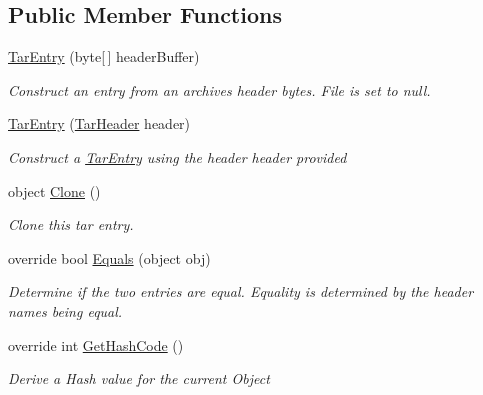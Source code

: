 \subsection*{Public Member Functions}
\begin{DoxyCompactItemize}
\item 
\hyperlink{class_i_c_sharp_code_1_1_sharp_zip_lib_1_1_tar_1_1_tar_entry_aa78f82fed0377b9b19d6d19eee461203}{Tar\+Entry} (byte\mbox{[}$\,$\mbox{]} header\+Buffer)
\begin{DoxyCompactList}\small\item\em Construct an entry from an archive\textquotesingle{}s header bytes. File is set to null. \end{DoxyCompactList}\item 
\hyperlink{class_i_c_sharp_code_1_1_sharp_zip_lib_1_1_tar_1_1_tar_entry_a3414a4fec2eb0cabf50995e25638d2f1}{Tar\+Entry} (\hyperlink{class_i_c_sharp_code_1_1_sharp_zip_lib_1_1_tar_1_1_tar_header}{Tar\+Header} header)
\begin{DoxyCompactList}\small\item\em Construct a \hyperlink{class_i_c_sharp_code_1_1_sharp_zip_lib_1_1_tar_1_1_tar_entry}{Tar\+Entry} using the {\itshape header} header provided \end{DoxyCompactList}\item 
object \hyperlink{class_i_c_sharp_code_1_1_sharp_zip_lib_1_1_tar_1_1_tar_entry_a57cc33b32d0a8bd13b53610f77465bf0}{Clone} ()
\begin{DoxyCompactList}\small\item\em Clone this tar entry. \end{DoxyCompactList}\item 
override bool \hyperlink{class_i_c_sharp_code_1_1_sharp_zip_lib_1_1_tar_1_1_tar_entry_a92ca060b2f9636dc6d1c78048848268e}{Equals} (object obj)
\begin{DoxyCompactList}\small\item\em Determine if the two entries are equal. Equality is determined by the header names being equal. \end{DoxyCompactList}\item 
override int \hyperlink{class_i_c_sharp_code_1_1_sharp_zip_lib_1_1_tar_1_1_tar_entry_a7570e02c6a85b336d2c0bcc6ed4d6526}{Get\+Hash\+Code} ()
\begin{DoxyCompactList}\small\item\em Derive a Hash value for the current Object \end{DoxyCompactList}\item 

\end{DoxyCompactItemize}

